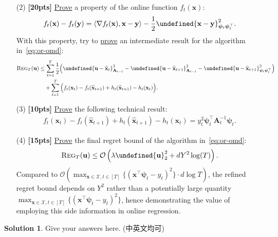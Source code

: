 \documentclass[a4paper]{article}
\numberwithin{equation}{section}
\theoremstyle{definition}
\newtheorem*{solution}{Solution}
\newcommand\inner[2]{\langle #1, #2 \rangle}
\theoremstyle{definition}
\def \A {\mathbf{A}}
\def \X {\mathcal{X}}
\def \O {\mathcal{O}}
\def \u {\textbf{u}}
\def \x {\textbf{x}}
\def \xh {\widehat{\x}}
\def \xh {\widehat{\x}}
\def \y {\textbf{y}}
\def \psib {\boldsymbol{\psi}}
\let\norm\undefined
\DeclarePairedDelimiter\norm{\lVert}{\rVert}
\begin{document}
\setlength{\leftskip}{0em}
\begin{itemize}
  \item[(2)] \textbf{[20pts]} \underline{Prove} a property of the online function $f_t(\x)$:
  \begin{align*}
    f_t(\x) - f_t(\y) = \inner{\nabla f_t(\x)}{\x - \y} - \frac{1}{2}\norm{\x - \y}_{\psib_t\psib_t^\top}^2.
  \end{align*}
  With this property, try to \underline{prove} an intermediate result for the algorithm in~\eqref{eq:or-omd}:
  \begin{align*}
    \textsc{Reg}_T(\u) &\leq \sum_{t=1}^T \frac{1}{2}\Big(\norm{\u - \xh_t}^2_{\A_{t-1}}- \norm{\u - \xh_{t+1}}^2_{\A_{t-1}}- \norm{\u - \xh_{t+1}}_{\psib_t\psib_t^\top}^2\Big)\\
    & \quad + \sum_{t=1}^T \Big(f_t(\x_t)  - f_t(\xh_{t+1}) + h_t(\xh_{t+1}) - h_t(\x_t)\Big).
  \end{align*}
  \item[(3)] \textbf{[10pts]} \underline{Prove} the following technical result: 
  \begin{align*}
    f_t(\x_t)  - f_t(\xh_{t+1}) + h_t(\xh_{t+1}) - h_t(\x_t) = y_t^2 \psib_t^\top \A_{t}^{-1} \psib_t.
  \end{align*}
  \item[(4)] \textbf{[15pts]} \underline{Prove} the final regret bound of the algorithm in~\eqref{eq:or-omd}:
  \begin{align*}
    \textsc{Reg}_T(\u) \leq \O\left(\lambda \norm{\u}_2^2 + dY^2 \log(T)\right).
  \end{align*}
  Compared to $\O\left(\max_{\x \in \X, t \in [T]}\{(\x^\top \psib_t - y_t)^2\} \cdot d\log T\right)$, the refined regret bound depends on $Y^2$ rather than a potentially large quantity $\max_{\x \in \X, t \in [T]}\{(\x^\top \psib_t - y_t)^2\}$, hence demonstrating the value of employing this side information in online regression. 
\end{itemize}


\begin{solution}
  Give your answers here. (中英文均可)
  ~\\
  ~\\
  ~\\
\end{solution}

\newpage
\end{document}
